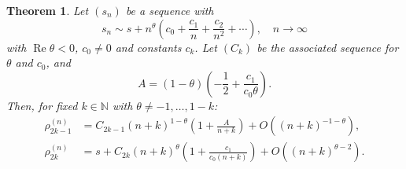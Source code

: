 \documentclass[a4paper,12pt]{article}
\numberwithin{equation}{section}
\newtheorem{satz}{Theorem}[section]
\theoremstyle{remark}
\begin{document}
\begin{satz}\label{satz1}
Let \((s_n)\) be a sequence with
\[
s_n \sim s + n^{\theta} \left( c_0 + \frac{c_1}{n} + \frac{c_2}{n^2} + \cdots \right), \quad n \to \infty
\]
\textit{with \(\operatorname{Re} \theta < 0\), \(c_0 \neq 0\) and constants \(c_k\). Let \((C_k)\) be the associated sequence for \(\theta\) and \(c_0\), and}
\[
A = (1 - \theta) \left( -\frac{1}{2} + \frac{c_1}{c_0 \theta} \right).
\]
\textit{Then, for fixed \(k \in \mathbb{N}\) with \(\theta \neq -1, \dots, 1 - k\):}
\begin{align*}
\rho_{2k-1}^{(n)} &= C_{2k-1} (n + k)^{1 - \theta} \left( 1 + \frac{A}{n + k} \right) + O\left( (n + k)^{-1 - \theta} \right), \\
\rho_{2k}^{(n)} &= s + C_{2k} (n + k)^{\theta} \left( 1 + \frac{c_1}{c_0 (n + k)} \right) + O\left( (n + k)^{\theta - 2} \right).
\end{align*}
\end{satz}
\end{document}
